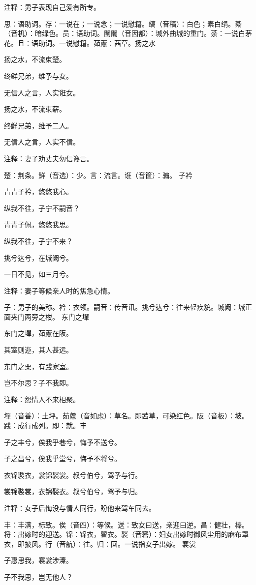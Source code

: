 \documentclass[12pt,UTF8]{ctexbook}
\begin{document}
注释：男子表现自己爱有所专。

思：语助词。存：一说在；一说念；一说慰籍。缟（音稿）：白色；素白绢。綦（音机）：暗绿色。员：语助词。闉闍（音因都）：城外曲城的重门。荼：一说白茅花。且：语助词。一说慰籍。茹藘：茜草。扬之水

扬之水，不流束楚。

终鲜兄弟，维予与女。

无信人之言，人实诳女。

扬之水，不流束薪。

终鲜兄弟，维予二人。

无信人之言，人实不信。

注释：妻子劝丈夫勿信谗言。

楚：荆条。鲜（音选）：少。言：流言。诳（音筐）：骗。 子衿

青青子衿，悠悠我心。

纵我不往，子宁不嗣音？

青青子佩，悠悠我思。

纵我不往，子宁不来？

挑兮达兮，在城阙兮。

一日不见，如三月兮。

注释：妻子等候亲人时的焦急心情。

子：男子的美称。衿：衣领。嗣音：传音讯。挑兮达兮：往来轻疾貌。城阙：城正面夹门两旁之楼。 东门之墠

东门之墠，茹藘在阪。

其室则迩，其人甚远。

东门之栗，有践家室。

岂不尔思？子不我即。

注释：怨情人不来相聚。

墠（音善）：土坪。茹藘（音如虑）：草名。即茜草，可染红色。阪（音板）：坡。践：成行成列。即：就。丰

子之丰兮，俟我乎巷兮，悔予不送兮。

子之昌兮，俟我乎堂兮，悔予不将兮。

衣锦褧衣，裳锦褧裳。叔兮伯兮，驾予与行。

裳锦褧裳，衣锦褧衣。叔兮伯兮，驾予与归。

注释：女子后悔没与情人同行，盼他来驾车同去。

丰：丰满，标致。俟（音四）：等候。送：致女曰送，亲迎曰逆。昌：健壮，棒。将：出嫁时的迎送。锦：锦衣，翟衣。褧（音窘）：妇女出嫁时御风尘用的麻布罩衣，即披风。行（音航）：往。归：回。一说指女子出嫁。 褰裳

子惠思我，褰裳涉溱。

子不我思，岂无他人？
\end{document}
